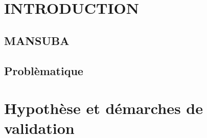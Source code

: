 \documentclass[a4paper]{article}
\begin{document}
\section{INTRODUCTION}

\subsection{MANSUBA}

\subsection{Problèmatique}


\section{Hypothèse et démarches de validation}


\section{}
\end{document}
